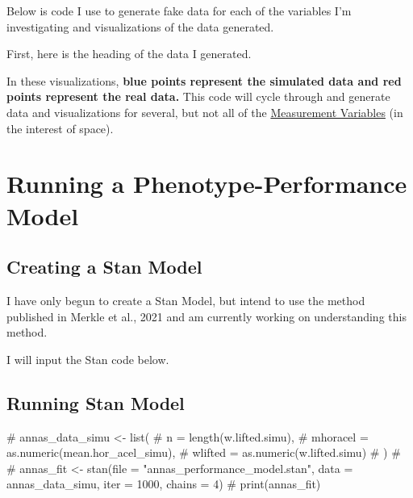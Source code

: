 \documentclass[
  letterpaper,
  DIV=11,
  numbers=noendperiod]{scrartcl}
\newenvironment{Shaded}{\begin{snugshade}}{\end{snugshade}}
\newcommand{\CommentTok}[1]{\textcolor[rgb]{0.37,0.37,0.37}{#1}}
\begin{document}
Below is code I use to generate fake data for each of the variables I'm
investigating and visualizations of the data generated.

First, here is the heading of the data I generated.

In these visualizations, \textbf{blue points represent the simulated
data and red points represent the real data.} This code will cycle
through and generate data and visualizations for several, but not all of
the \protect\hyperlink{measurement-variables}{Measurement Variables} (in
the interest of space).

\hypertarget{running-a-phenotype-performance-model}{%
\section{Running a Phenotype-Performance
Model}\label{running-a-phenotype-performance-model}}

\hypertarget{creating-a-stan-model}{%
\subsection{Creating a Stan Model}\label{creating-a-stan-model}}

I have only begun to create a Stan Model, but intend to use the method
published in Merkle et al., 2021 and am currently working on
understanding this method.

I will input the Stan code below.

\hypertarget{running-stan-model}{%
\subsection{Running Stan Model}\label{running-stan-model}}

\begin{Shaded}
\begin{Highlighting}[]
\CommentTok{\# annas\_data\_simu \textless{}{-} list(}
\CommentTok{\#       n = length(w.lifted.simu),}
\CommentTok{\#       mhoracel = as.numeric(mean.hor\_acel\_simu),}
\CommentTok{\#       wlifted = as.numeric(w.lifted.simu)}
\CommentTok{\# )}
\CommentTok{\# }
\CommentTok{\# annas\_fit \textless{}{-} stan(file = "annas\_performance\_model.stan", data = annas\_data\_simu, iter = 1000, chains = 4)}
\CommentTok{\# print(annas\_fit)}
\end{Highlighting}
\end{Shaded}

\hypertarget{section-1}{%
\section{}\label{section-1}}
\end{document}
